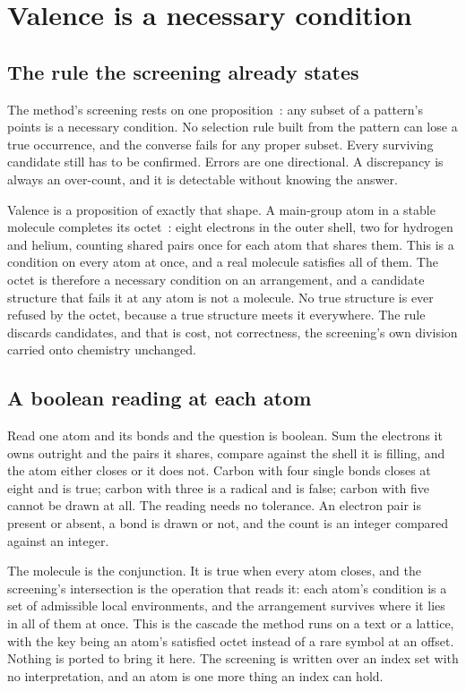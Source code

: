 \chapter{Valence is a necessary condition}

\section{The rule the screening already states}

The method's screening rests on one proposition~\cite{src:Quigg-orior-workbook}: any subset of a
pattern's points is a necessary condition. No selection rule built from the pattern can lose a true
occurrence, and the converse fails for any proper subset. Every surviving candidate still has to be
confirmed. Errors are one directional. A discrepancy is always an over-count, and it is detectable
without knowing the answer.

Valence is a proposition of exactly that shape. A main-group atom in a stable molecule completes its
octet~\cite{src:Lewis-1916,src:Langmuir-1919}: eight electrons in the outer shell, two for hydrogen and helium, counting shared pairs once
for each atom that shares them. This is a condition on every atom at once, and a real molecule
satisfies all of them. The octet is therefore a necessary condition on an arrangement, and a candidate
structure that fails it at any atom is not a molecule. No true structure is ever refused by the
octet, because a true structure meets it everywhere. The rule discards candidates, and that
is cost, not correctness, the screening's own division carried onto chemistry unchanged.

\section{A boolean reading at each atom}

Read one atom and its bonds and the question is boolean. Sum the electrons it owns outright and the
pairs it shares, compare against the shell it is filling, and the atom either closes or it does not.
Carbon with four single bonds closes at eight and is true; carbon with three is a radical and is
false; carbon with five cannot be drawn at all. The reading needs no tolerance. An electron pair is
present or absent, a bond is drawn or not, and the count is an integer compared against an integer.

The molecule is the conjunction. It is true when every atom closes, and the screening's intersection
is the operation that reads it: each atom's condition is a set of admissible local environments, and
the arrangement survives where it lies in all of them at once. This is the cascade the method runs
on a text or a lattice, with the key being an atom's satisfied octet instead of a rare symbol at an
offset. Nothing is ported to bring it here. The screening is written over an index set with no
interpretation, and an atom is one more thing an index can hold.

